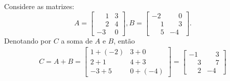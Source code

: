 \documentclass{beamer}
\begin{document}
  \begin{frame}
    \begin{exemplos}
      Considere as matrizes:
      \[
        A = \begin{bmatrix}
          \phantom{-}1 & 3\\
          \phantom{-}2 & 4\\
          -3 & 0
        \end{bmatrix}, 
       B = \begin{bmatrix}
          -2 & \phantom{-}0\\
          \phantom{-}1 & \phantom{-}3\\
          \phantom{-}5 & -4 
        \end{bmatrix}.
    \]
    Denotando por $C$ a soma de $A$ e $B$, então
    \begin{eqnarray*}
     C = A + B = \begin{bmatrix}
       1 + (-2) & 3 + 0\\
       2 + 1 & 4 + 3\\
       -3 + 5 & 0 + (-4)
     \end{bmatrix} = \begin{bmatrix}
      -1 & \phantom{-}3\\
      \phantom{-}3 & \phantom{-}7\\
      \phantom{-}2 & -4
     \end{bmatrix} 
    \end{eqnarray*}
    \end{exemplos}
  \end{frame}
\end{document}
